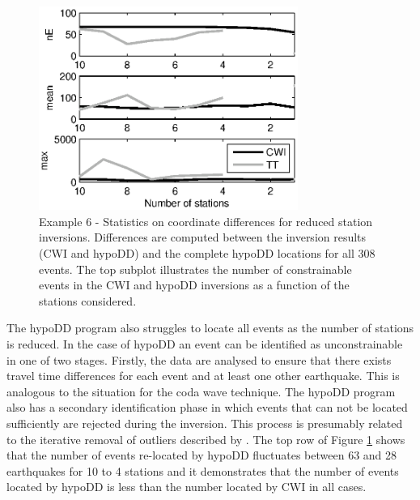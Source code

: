 \documentclass[extra, onecolumn, doublespacing]{gji}
\begin{document}
\begin{figure}
\noindent\includegraphics[width =
20pc]{diags/CalaverasLoc4_hypoDD_SVD.eps} \caption{Example 6 -
Statistics on coordinate differences for reduced station inversions.
Differences are computed between the inversion results (CWI and
hypoDD) and the complete hypoDD locations for all 308 events. The
top subplot illustrates the number of constrainable events in the
CWI and hypoDD inversions as a function of the stations considered.}
\label{fig-statremoval_summarystats}
\end{figure}


The hypoDD program also struggles to locate all events as the number
of stations is reduced. In the case of hypoDD an event can be
identified as unconstrainable in one of two stages. Firstly, the
data are analysed to ensure that there exists travel time
differences for each event and at least one other earthquake. This
is analogous to the situation for the coda wave technique. The
hypoDD program also has a secondary identification phase in which
events that can not be located sufficiently are rejected during the
inversion. This process is presumably related to the iterative
removal of outliers described by \citet{dr_Waldhauser00a}. The top
row of Figure \ref{fig-statremoval_summarystats} shows that the
number of events re-located by hypoDD fluctuates between 63 and 28
earthquakes for 10 to 4 stations and it demonstrates that the number
of events located by hypoDD is less than the number located by CWI
in all cases.
\end{document}
